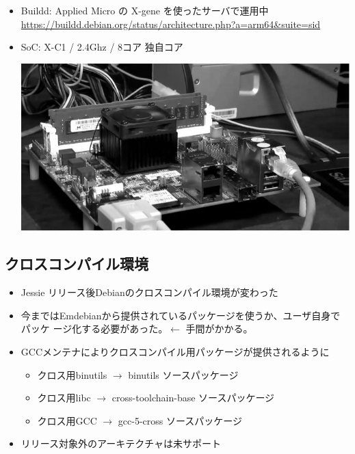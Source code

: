 \documentclass[mingoth,a4paper]{jsarticle}
\begin{document}
  \begin{itemize}
  \item Buildd: Applied Micro の X-gene を使ったサーバで運用中
     \url{https://buildd.debian.org/status/architecture.php?a=arm64&suite=sid}
  \item SoC: X-C1 / 2.4Ghz / 8コア 独自コア

  \begin{center}
  \includegraphics[width=0.7\hsize]{image201511/x-gene_mono.jpg}
  \end{center}

  \end{itemize}



%
%
%
%



  \subsection{クロスコンパイル環境}
  \begin{itemize}
  \item Jessie リリース後Debianのクロスコンパイル環境が変わった
  \item 今まではEmdebianから提供されているパッケージを使うか、ユーザ自身でパッケ
ージ化する必要があった。$\leftarrow$ 手間がかかる。

  \item GCCメンテナによりクロスコンパイル用パッケージが提供されるように

  \begin{itemize}
    \item クロス用binutils $\rightarrow$ binutils ソースパッケージ
    \item クロス用libc $\rightarrow$ cross-toolchain-base ソースパッケージ
    \item クロス用GCC $\rightarrow$ gcc-5-cross ソースパッケージ


  \end{itemize}

  \item リリース対象外のアーキテクチャは未サポート
  \end{itemize}
\end{document}
